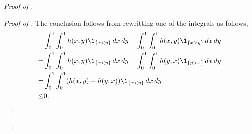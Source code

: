 \begin{proof}[Proof of ]
\begin{proof}[Proof of ]
  The conclusion follows from rewritting one of the
  integrals as follows,
  \begin{align*}
    &\int_0^1 \int_0^1 h(x,y) \1_{\{x < y\}} \, dx \, dy - \int_0^1
      \int_0^1 h(x,y) \1_{\{x > y\}} \, dx \, dy \\
    =& \int_0^1 \int_0^1 h(x,y) \1_{\{x < y\}} \, dx \, dy - \int_0^1
       \int_0^1 h(y,x) \1_{\{y > x\}} \, dx \, dy \\
    =& \int_0^1 \int_0^1 (h(x,y) -h(y,x)) \1_{\{x < y\}} \, dx \, dy
    \\
    \leq& 0.
  \end{align*}
\renewcommand{\qedsymbol}{}
\end{proof}
\vspace{-2em}
\end{proof}

